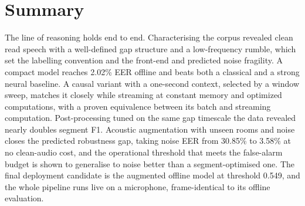 \documentclass{article}
\begin{document}
\section*{Summary}

The line of reasoning holds end to end. Characterising the corpus revealed clean read speech with a well-defined gap structure and a low-frequency rumble, which set the labelling convention and the front-end and predicted noise fragility. A compact model reaches 2.02\% EER offline and beats both a classical and a strong neural baseline. A causal variant with a one-second context, selected by a window sweep, matches it closely while streaming at constant memory and optimized computations, with a proven equivalence between its batch and streaming computation. Post-processing tuned on the same gap timescale the data revealed nearly doubles segment F1. Acoustic augmentation with unseen rooms and noise closes the predicted robustness gap, taking noise EER from 30.85\% to 3.58\% at no clean-audio cost, and the operational threshold that meets the false-alarm budget is shown to generalise to noise better than a segment-optimised one. The final deployment candidate is the augmented offline model at threshold 0.549, and the whole pipeline runs live on a microphone, frame-identical to its offline evaluation.
\end{document}
